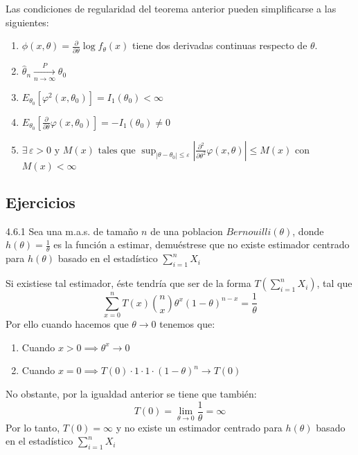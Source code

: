 \begin{observación}
Las condiciones de regularidad del teorema anterior pueden simplificarse a las siguientes:\\
\begin{enumerate}
  \item $\phi (x, \theta) = \frac{\partial}{\partial \theta} \log f_{\theta}(x)$ tiene dos derivadas continuas respecto de $\theta$.
  \item $\hat{\theta}_n \xrightarrow[n \to \infty]{P} \theta_0$
  \item $E_{\theta_0}[\varphi^2(x, \theta_0)] = I_1(\theta_0) < \infty$
  \item $E_{\theta_0} \left[ \frac{\partial}{\partial \theta} \varphi(x, \theta_0) \right] = - I_1(\theta_0) \neq 0$
  \item $\exists \, \varepsilon > 0 \text{ y } M(x) \text{ tales que } \sup_{|\theta - \theta_0| \leq \varepsilon} \left| \frac{\partial^2}{\partial \theta^2} \varphi(x, \theta) \right| \leq M(x)$ con $M(x) < \infty$
\end{enumerate}
\end{observación}

\subsection{Ejercicios}
\begin{problem}{4.6.1}
  Sea una m.a.s. de tamaño $n$ de una poblacion $Bernouilli(\theta)$, donde $h(\theta) = \frac{1}{\theta}$ es la función a estimar, demuéstrese que no existe estimador centrado para $h(\theta)$ basado en el estadístico $\sum_{i=1}^{n} X_i$
\end{problem}
\begin{sol}
  Si existiese tal estimador, éste tendría que ser de la forma $T\left(\sum_{i = 1}^{n} X_i\right)$, tal que 
  $$\sum_{x = 0}^{n} T(x) \binom{n}{x} \theta^x (1 - \theta)^{n - x} = \frac{1}{\theta}$$
  Por ello cuando hacemos que $\theta \to 0$ tenemos que: 
  \begin{enumerate}
    \item Cuando $x > 0 \implies \theta^x \to 0$ 
    \item Cuando $x = 0 \implies T(0) \cdot 1 \cdot 1 \cdot (1 - \theta)^n \to T(0)$
  \end{enumerate}
  No obstante, por la igualdad anterior se tiene que también: 
  $$T(0) = \lim_{\theta \to 0} \frac{1}{\theta} = \infty$$
  Por lo tanto, $T(0) = \infty$ y no existe un estimador centrado para $h(\theta)$ basado en el estadístico $\sum_{i=1}^{n} X_i$
\end{sol}

